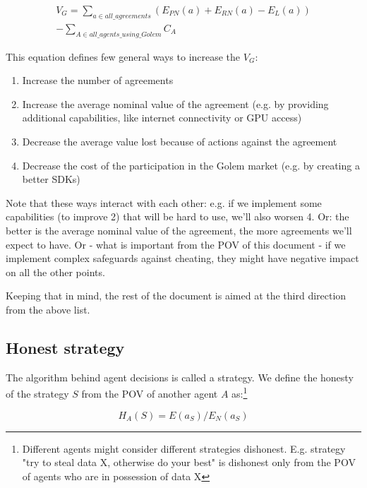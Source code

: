 \documentclass{article}
\begin{document}
\begin{equation}
\begin{split}
    V_G = \sum_{a \in all\_agreements}(E_{PN}(a) + E_{RN}(a) - E_L(a)) \\
          - \sum_{A \in all\_agents\_using\_Golem}C_A
\end{split}
\end{equation}

This equation defines few general ways to increase the $V_G$:

\begin{enumerate}
\item Increase the number of agreements
\item Increase the average nominal value of the agreement (e.g. by providing additional capabilities, like internet connectivity or GPU access)
\item Decrease the average value lost because of actions against the agreement
\item Decrease the cost of the participation in the Golem market (e.g. by creating a better SDKs)
\end{enumerate}

Note that these ways interact with each other: e.g. if we implement some capabilities (to improve 2) that will be hard to use, we'll also worsen 4.
Or: the better is the average nominal value of the agreement, the more agreements we'll expect to have.
Or - what is important from the POV of this document - if we implement complex safeguards against cheating, they might have negative impact on all the other points.

Keeping that in mind, the rest of the document is aimed at the third direction from the above list.

\subsection{Honest strategy}

The algorithm behind agent decisions is called a strategy. We define the honesty of the strategy $S$ from the POV of another agent $A$ as:\footnote{Different agents 
might consider different strategies dishonest. E.g. strategy "try to steal data X, otherwise do your best" is dishonest only from the POV of agents who 
are in possession of data X}

\begin{equation}
    H_A(S) = E(a_S) / E_N(a_S)
\end{equation}
\end{document}
